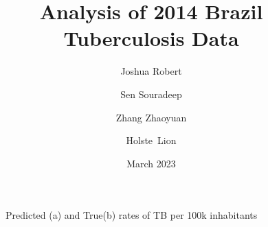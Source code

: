 \documentclass{article}
\title{Analysis of 2014 Brazil Tuberculosis Data}
\author{
    Joshua Robert \\
    \and
    Sen Souradeep \\
    \and
    Zhang Zhaoyuan \\
    \and
    Holste Lion
}
\date{March 2023}
\begin{document}
\maketitle

\begin{multicols}{2}








\end{multicols}

\begin{figure}[H]
	\centering
	\qquad
	\caption{Predicted (a) and True(b) rates of TB per 100k inhabitants}%
	\label{fig:pred_TB_rate_map}%
\end{figure}

\vspace*{2cm}



\end{document}
